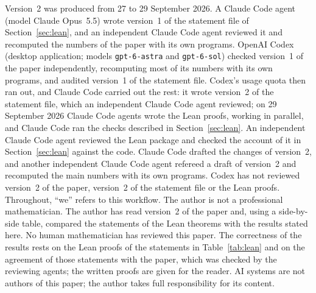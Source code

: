 \documentclass[11pt]{article}
\theoremstyle{remark}
\begin{document}
Version~2 was produced from 27 to 29 September 2026.
A Claude Code agent (model Claude Opus~5.5) wrote version~1 of the statement
file of Section~\ref{sec:lean}, and an independent Claude Code agent reviewed
it and recomputed the numbers of the paper with its own programs. OpenAI Codex
(desktop application; models \texttt{gpt-6-astra} and \texttt{gpt-6-sol})
checked version~1 of the paper independently, recomputing most of its numbers
with its own programs, and audited version~1 of the statement file. Codex's usage quota
then ran out, and Claude Code carried out the rest: it wrote version~2 of the
statement file, which an independent Claude Code agent reviewed; on
29 September 2026 Claude Code agents wrote the Lean proofs, working in
parallel, and Claude Code ran the checks described in Section~\ref{sec:lean}.
An independent Claude Code agent reviewed the Lean package and checked the
account of it in Section~\ref{sec:lean} against the code. Claude Code drafted
the changes of version~2, and another independent Claude Code agent refereed a
draft of version~2 and recomputed the main numbers with its own programs.
Codex has not reviewed version~2 of the paper, version~2 of the statement
file or the Lean proofs. Throughout, ``we'' refers to this workflow. The
author is not a professional mathematician.
The author has read version~2 of the paper and, using a side-by-side table,
compared the statements of the Lean theorems with the results stated here.
No human mathematician has reviewed this paper. The correctness of the
results rests on the Lean proofs of the statements in Table~\ref{tab:lean}
and on the agreement of those statements with the paper, which was checked
by the reviewing agents; the written proofs are given for the reader. AI
systems are not authors of this paper; the author takes full responsibility
for its content.
\end{document}
